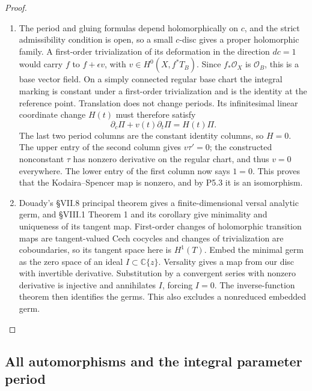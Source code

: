 \begin{proof}
\begin{enumerate}[label=\arabic*.,leftmargin=*]
\item The period and gluing formulas depend holomorphically on $c$, and the
strict admissibility condition is open, so a small $c$-disc gives a
proper holomorphic family.  A first-order trivialization of its
deformation in the direction $dc=1$ would carry $f$ to
$f+\epsilon v$, with $v\in H^0(X,f^*T_B)$.  Since $f_*\mathcal O_X$
is $\mathcal O_B$, this is a base vector field.  On a simply connected
regular base chart the integral marking is constant under a first-order
trivialization and is the identity at the reference point.  Translation
does not change periods.  Its infinitesimal linear coordinate change
$H(t)$ must therefore satisfy
\[
 \partial_c\Pi+v(t)\partial_t\Pi=H(t)\Pi.
\]
The last two period columns are the constant identity columns, so
$H=0$.  The upper entry of the second column gives $v\tau'=0$; the
constructed nonconstant $\tau$ has nonzero derivative on the regular
chart, and thus $v=0$ everywhere.  The lower entry of the first column
now says $1=0$.  This proves that the Kodaira--Spencer map is nonzero,
and by P5.3 it is an isomorphism.

\item Douady's \S VII.8 principal theorem gives a finite-dimensional versal
analytic germ, and \S VIII.1 Theorem 1 and its corollary give minimality
and uniqueness of its tangent map.  First-order changes of holomorphic
transition maps are tangent-valued Cech cocycles and changes of
trivialization are coboundaries, so its tangent space here is $H^1(T)$.
Embed the minimal germ as the zero space of an ideal
$I\subset\mathbb C\{z\}$.  Versality gives a map from our disc with
invertible derivative.  Substitution by a convergent series with
nonzero derivative is injective and annihilates $I$, forcing $I=0$.
The inverse-function theorem then identifies the germs.  This also
excludes a nonreduced embedded germ.
\end{enumerate}
\end{proof}

\subsection{All automorphisms and the integral parameter period}

